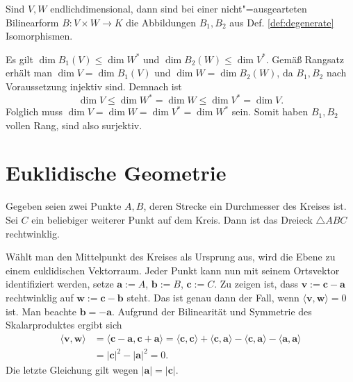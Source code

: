 \begin{Satz}
Sind $V,W$ endlichdimensional, dann sind bei einer nicht"=ausgearteten
Bilinearform $B\colon V\times W\to K$ die Abbildungen $B_1,B_2$ aus
Def. \ref{def:degenerate} Isomorphismen.
\end{Satz}
\begin{Beweis}
Es gilt $\dim B_1(V)\le\dim W^*$ und $\dim B_2(W)\le\dim V^*$. Gemäß
Rangsatz erhält man $\dim V=\dim B_1(V)$ und $\dim W=\dim B_2(W)$,
da $B_1,B_2$ nach Voraussetzung injektiv sind. Demnach ist
\begin{equation}
\dim V \le \dim W^* = \dim W \le \dim V^* = \dim V.
\end{equation}
Folglich muss $\dim V=\dim W=\dim V^*=\dim W^*$ sein. Somit haben
$B_1,B_2$ vollen Rang, sind also surjektiv.\;\qedsymbol
\end{Beweis}

\newpage
\section{Euklidische Geometrie}

\begin{Satz}\newlinefirst
Gegeben seien zwei Punkte $A,B$, deren Strecke ein Durchmesser
des Kreises ist. Sei $C$ ein beliebiger weiterer Punkt auf dem
Kreis. Dann ist das Dreieck $\triangle ABC$ rechtwinklig.
\end{Satz}
\begin{Beweis}
Wählt man den Mittelpunkt des Kreises als Ursprung aus, wird die
Ebene zu einem euklidischen Vektorraum. Jeder Punkt kann nun mit
seinem Ortsvektor identifiziert werden, setze $\mathbf a := A$,
$\mathbf b := B$, $\mathbf c := C$. Zu zeigen ist, dass
$\mathbf v:=\mathbf c-\mathbf a$ rechtwinklig auf
$\mathbf w:=\mathbf c-\mathbf b$  steht. Das ist genau dann der Fall,
wenn $\langle\mathbf v,\mathbf w\rangle = 0$ ist.
Man beachte $\mathbf b = -\mathbf a$. Aufgrund der Bilinearität und
Symmetrie des Skalarproduktes ergibt sich%
\begin{align}
\langle\mathbf v,\mathbf w\rangle
&= \langle\mathbf c-\mathbf a,\mathbf c+\mathbf a\rangle
= \langle\mathbf c,\mathbf c\rangle
+ \langle\mathbf c,\mathbf a\rangle
- \langle\mathbf c,\mathbf a\rangle
- \langle\mathbf a,\mathbf a\rangle\\
&= |\mathbf c|^2-|\mathbf a|^2 = 0.
\end{align}
Die letzte Gleichung gilt wegen $|\mathbf a|=|\mathbf c|$.\;\qedsymbol
\end{Beweis}

